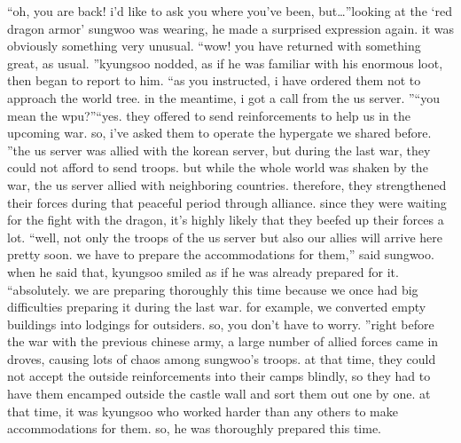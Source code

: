 “oh, you are back! i’d like to ask you where you’ve been, but…”looking at the ‘red dragon armor’ sungwoo was wearing, he made a surprised expression again.
 it was obviously something very unusual.
“wow! you have returned with something great, as usual.
”kyungsoo nodded, as if he was familiar with his enormous loot, then began to report to him.
“as you instructed, i have ordered them not to approach the world tree.
 in the meantime, i got a call from the us server.
”“you mean the wpu?”“yes.
 they offered to send reinforcements to help us in the upcoming war.
 so, i’ve asked them to operate the hypergate we shared before.
”the us server was allied with the korean server, but during the last war, they could not afford to send troops.
 but while the whole world was shaken by the war, the us server allied with neighboring countries.
 therefore, they strengthened their forces during that peaceful period through alliance.
 since they were waiting for the fight with the dragon, it’s highly likely that they beefed up their forces a lot.
“well, not only the troops of the us server but also our allies will arrive here pretty soon.
 we have to prepare the accommodations for them,” said sungwoo.
when he said that, kyungsoo smiled as if he was already prepared for it.
“absolutely.
 we are preparing thoroughly this time because we once had big difficulties preparing it during the last war.
 for example, we converted empty buildings into lodgings for outsiders.
 so, you don’t have to worry.
”right before the war with the previous chinese army, a large number of allied forces came in droves, causing lots of chaos among sungwoo’s troops.
at that time, they could not accept the outside reinforcements into their camps blindly, so they had to have them encamped outside the castle wall and sort them out one by one.
at that time, it was kyungsoo who worked harder than any others to make accommodations for them.
 so, he was thoroughly prepared this time.


 